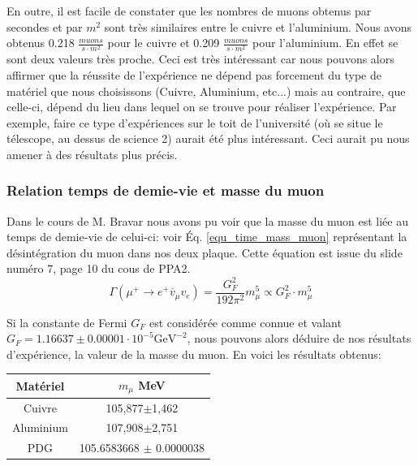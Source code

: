 \documentclass[12pt]{article}
\begin{document}
    En outre, il est facile de constater que les nombres de muons obtenus par secondes et par $m^{2}$ sont très similaires entre le cuivre et l'aluminium. Nous avons obtenus 0.218 $\frac{muons}{s\cdot m^{2}}$ pour le cuivre et 0.209 $\frac{muons}{s\cdot m^{2}}$ pour l'aluminium. En effet se sont deux valeurs très proche. Ceci est très intéressant car nous pouvons alors affirmer que la réussite de l'expérience ne dépend pas forcement du type de matériel que nous choisissons (Cuivre, Aluminium, etc...) mais au contraire, que celle-ci, dépend du lieu dans lequel on se trouve pour réaliser l'expérience. Par exemple, faire ce type d'expériences sur le toit de l'université (où se situe le télescope, au dessus de science 2) aurait été plus intéressant. Ceci aurait pu nous amener à des résultats plus précis. 

\subsubsection{Relation temps de demie-vie et masse du muon}

Dans le cours de M. Bravar nous avons pu voir que la masse du muon est liée au temps de demie-vie de celui-ci: voir Éq. \ref{equ_time_mass_muon} représentant la désintégration du muon dans nos deux plaque. Cette équation est issue du slide numéro 7, page 10 du cous de PPA2.
\begin{equation}
\Gamma\left(\mu^{+} \rightarrow e^{+} \overline{v}_{\mu} v_{e}\right)=\frac{G_{F}^{2}}{192 \pi^{2}} m_{\mu}^{5} \propto G_{F}^{2}\cdot m_{\mu}^{5} 
\label{equ_time_mass_muon}
\end{equation}

Si la constante de Fermi $G_{F}$ est considérée comme connue et valant $G_{F}=1.16637\pm0.00001\cdot10^{-5} \text{GeV}^{-2}$, nous pouvons alors déduire de nos résultats d'expérience, la valeur de la masse du muon. En voici les résultats obtenus:


\begin{center}
\begin{tabular}{||c|c||}
    \hline
    \textbf{Matériel} & \textbf{$m_{\mu}$ MeV}  \\
    \hline\hline
    Cuivre & 105,877$\pm$1,462 \\
    \hline
    Aluminium & 107,908$\pm$2,751\\
    \hline
    PDG & 105.6583668 $\pm$ 0.0000038 \\
    \hline
\end{tabular}
\end{center}
\end{document}
